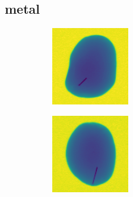 \documentclass[11pt]{article}
\begin{document}
\subsection{metal}

\begin{figure}[!h]
    \captionsetup[subfigure]{labelformat=empty}
     \centering
     \begin{subfigure}[b]{0.22\textwidth}
         \centering
         \includegraphics[width=\textwidth]{figurer/potato_dataset/metal/metal_0.jpg}
         \caption{}
         \label{fig:metal_0}
     \end{subfigure}
     \hfill
     \begin{subfigure}[b]{0.22\textwidth}
         \centering
         \includegraphics[width=\textwidth]{figurer/potato_dataset/metal/metal_1.jpg}

\end{subfigure}
\end{figure}
\end{document}
